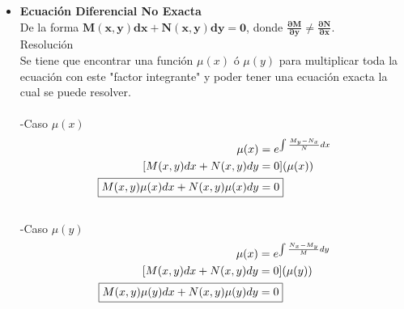 \documentclass{article}
\begin{document}
\begin{itemize}
    \item \textbf{Ecuación Diferencial No Exacta}\\
    De la forma $\boldsymbol{M(x,y)dx + N(x,y)dy = 0} $, donde
     \textbf{$\boldsymbol{\frac{\partial M}{\partial y} \neq \frac{\partial N}{\partial x}}$}.\\
    Resolución \\
    Se tiene que encontrar una función $\mu(x)$ ó $\mu(y)$ para multiplicar toda la ecuación 
    con este "factor integrante" y poder tener una ecuación exacta la cual se puede resolver.\\
    \\-Caso $\mu(x)$ \\
    \begin{align*}
        \mu(x) & = e^{\int \frac{M_y - N_x}{N} dx} \\
        [ M(x,y)dx + N(x,y)dy & = 0 ] (\mu(x)) \\
        \Aboxed{M(x,y)\mu(x)dx + N(x,y)\mu(x)dy & = 0}
    \end{align*}
    \\-Caso $\mu(y)$ \\
    \begin{align*}
        \mu(x) & = e^{\int \frac{N_x - M_y}{M} dy} \\
        [ M(x,y)dx + N(x,y)dy & = 0 ] (\mu(y)) \\
        \Aboxed{M(x,y)\mu(y)dx + N(x,y)\mu(y)dy & = 0}
    \end{align*}


\end{itemize}
\end{document}
